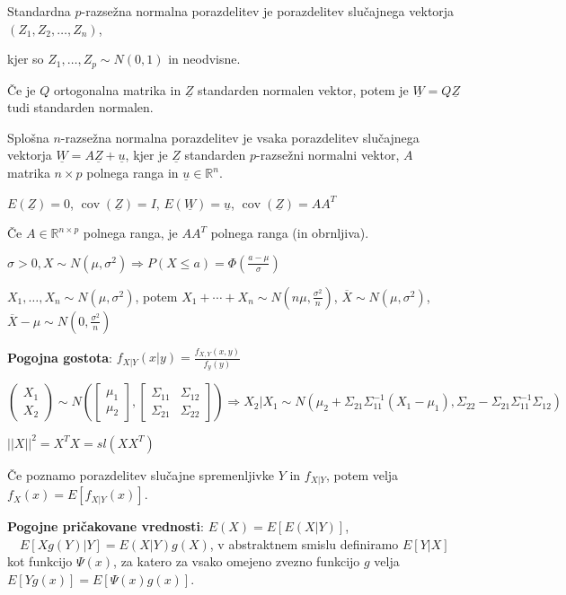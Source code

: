 \documentclass[11pt,a4paper]{amsart}
\theoremstyle{definition} %
\theoremstyle{plain} %
\newcommand{\R}{\mathbb R}
\newcommand{\Z}{\underline{Z}}
\newcommand{\W}{\underline{W}}
\newcommand{\uu}{\underline{u}}
\DeclareMathOperator{\cov}{cov}
\begin{document}
Standardna $p$-razsežna normalna porazdelitev je porazdelitev slučajnega
vektorja $ \left( Z_1 ,  Z_2 , \ldots , Z_n  \right)$,

  kjer so $Z_1, \ldots , Z_p \sim N(0,1)$ in neodvisne.

Če je $Q$ ortogonalna matrika in $\Z$ standarden normalen vektor,
potem je $\W = Q\Z$ tudi standarden normalen.

Splošna $n$-razsežna normalna porazdelitev je vsaka porazdelitev slučajnega
vektorja $\W = A\Z+\uu$, kjer je $\Z$
standarden $p$-razsežni normalni vektor, $A$ matrika $n \times p$ polnega ranga
in $\uu \in \R^n$.

$E(\Z) = 0$, $\cov(\Z) = I$, $E(\underline{W}) =
\uu$, $\cov(\Z) = AA^T$

Če $A \in \R^{n\times p}$ polnega ranga, je $AA^T$ polnega ranga (in obrnljiva).

$\sigma > 0, X \sim N(\mu, \sigma^2 ) \Longrightarrow P(X \leq a ) = \Phi
(\frac{a-\mu}{\sigma})$

$X_1,\ldots, X_n \sim N(\mu, \sigma^2)$, potem $X_1  + \cdots +  X_n \sim N(n\mu, \frac{\sigma^2}{n})$, $\overline{X} \sim N(\mu, \sigma^2)$, $\overline{X} - \mu \sim N(0, \frac{\sigma^2}{n})$

\textbf{Pogojna gostota}: $f_{X|Y}(x|y) = \frac{f_{X,Y}(x,y)}{f_y (y)}$

$\left( \begin{matrix} X_1 \\ X_2 \end{matrix} \right)
\sim
N \left(
\left[ \begin{matrix} \mu_1 \\ \mu_2 \end{matrix} \right],
\left[ \begin{matrix} \Sigma_{11} & \Sigma_{12} \\ \Sigma_{21} & \Sigma_{22} \end{matrix} \right] \right)
\Longrightarrow
X_2 | X_1 \sim N(\mu_2 +  \Sigma_{21}\Sigma_{11}^{-1} (X_1 - \mu_1), \Sigma_{22} - \Sigma_{21} \Sigma_{11}^{-1} \Sigma_{12} )$

$||X||^2 = X^T X = sl(XX^T)$

Če poznamo porazdelitev slučajne spremenljivke $Y$ in $f_{X|Y}$, potem velja
$f_X(x) = E[f_{X|Y}(x)]$.

\textbf{Pogojne pričakovane vrednosti}: $E(X) = E[E(X|Y)]$, $ \quad E[Xg(Y)|Y] =
E(X|Y)g(X)$, v abstraktnem smislu definiramo $E[Y|X]$ kot funkcijo $\Psi(x)$, za katero
za vsako omejeno zvezno funkcijo $g$ velja $E[Yg(x)]=E[\Psi(x)g(x)]$.
\end{document}
